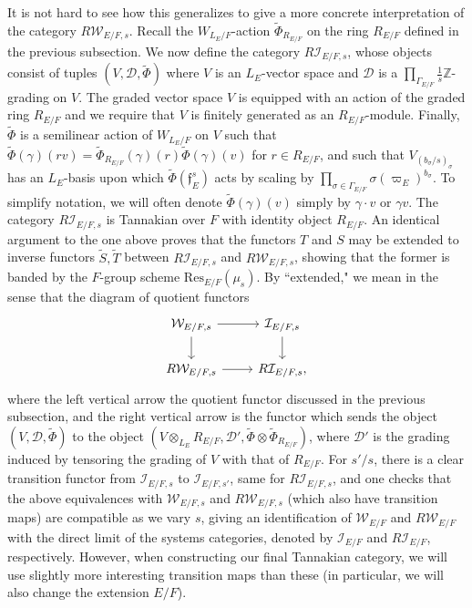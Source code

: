 \documentclass[11pt]{amsart}
\theoremstyle{definition}
\newcommand{\mc}{\mathcal}
\newcommand{\Z}{\mathbb{Z}}
\newcommand{\mf}{\mathfrak}
\begin{document}
It is not hard to see how this generalizes to give a more concrete interpretation of the category $R\mc{W}_{E/F,s}$. Recall the $W_{L_{E}/F}$-action $\tilde{\Phi}_{R_{E/F}}$ on the ring $R_{E/F}$ defined in the previous subsection. We now define the category $R\mc{I}_{E/F,s}$, whose objects consist of tuples $(V, \mc{D},\tilde{\Phi})$ where $V$ is an $L_E$-vector space and $\mc{D}$ is a $\prod\limits_{\Gamma_{E/F}} \frac{1}{s}\Z$-grading on $V$. The graded vector space $V$ is equipped with an action of the graded ring $R_{E/F}$ and we require that $V$ is finitely generated as an $R_{E/F}$-module. Finally, $\tilde{\Phi}$ is a semilinear action of $W_{L_E/F}$ on $V$ such that $\tilde{\Phi}(\gamma)(rv)=\tilde{\Phi}_{R_{E/F}}(\gamma)(r) \tilde{\Phi}(\gamma)(v)$ for $r \in R_{E/F}$, and such that $V_{(b_{\sigma}/s)_{\sigma}}$ has an $L_E$-basis upon which $\tilde{\Phi}(\mf{f}^s_E)$ acts by scaling by $\prod\limits_{\sigma \in \Gamma_{E/F}} \sigma(\varpi_E)^{b_{\sigma}}$. To simplify notation, we will often denote $\tilde{\Phi}(\gamma)(v)$ simply by $\gamma \cdot v$ or $\gamma v$. The category $R\mc{I}_{E/F, s}$ is Tannakian over $F$ with identity object $R_{E/F}$. An identical argument to the one above proves that the functors $T$ and $S$ may be extended to inverse functors $\tilde{S}, \tilde{T}$ between $R\mc{I}_{E/F,s}$ and $R\mc{W}_{E/F,s}$, showing that the former is banded by the $F$-group scheme $\text{Res}_{E/F}(\mu_{s})$. By ``extended," we mean in the sense that the diagram of quotient functors
\[
\begin{tikzcd}
\mc{W}_{E/F,s} \arrow{d} \arrow{r} & \mc{I}_{E/F,s} \arrow{d} \\
R\mc{W}_{E/F,s} \arrow{r} & R \mc{I}_{E/F,s},
\end{tikzcd}
\]
where the left vertical arrow the quotient functor discussed in the previous subsection, and the right vertical arrow is the functor which sends the object $(V, \mc{D}, \tilde{\Phi})$ to the object $(V \otimes_{L_{E}} R_{E/F}, \mc{D}', \tilde{\Phi} \otimes \tilde{\Phi}_{R_{E/F}})$, where $\mc{D}'$ is the grading induced by tensoring the grading of $V$ with that of $R_{E/F}$. For $s'/s$, there is a clear transition functor from $\mc{I}_{E/F,s}$ to $\mc{I}_{E/F,s'}$, same for $R\mc{I}_{E/F,s}$, and one checks that the above equivalences with $\mc{W}_{E/F,s}$ and $R\mc{W}_{E/F,s}$ (which also have transition maps) are compatible as we vary $s$, giving an identification of $\mc{W}_{E/F}$ and $R\mc{W}_{E/F}$ with the direct limit of the systems categories, denoted by $\mc{I}_{E/F}$ and $R\mc{I}_{E/F}$, respectively. However, when constructing our final Tannakian category, we will use slightly more interesting transition maps than these (in particular, we will also change the extension $E/F$).
\end{document}
